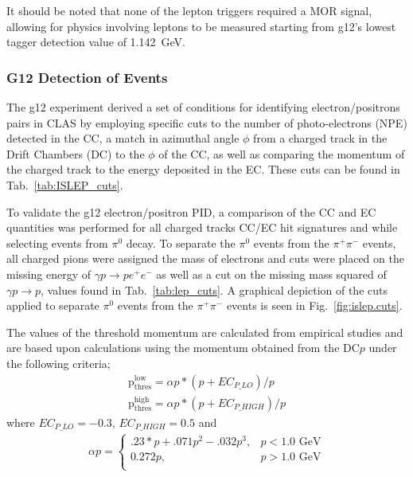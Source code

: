It should be noted that none of the lepton triggers required a MOR signal, allowing for physics involving leptons to be measured starting from g12's lowest tagger detection value of 1.142~GeV.





\FloatBarrier
	\subsubsection{G12 Detection of \epemT Events} 
     The g12 experiment derived a set of conditions for identifying electron/positrons pairs in CLAS by employing specific cuts to the number of photo-electrons (NPE) detected in the CC, a match in azimuthal angle $\phi$ from a charged track in the Drift Chambers (DC) to the $\phi$ of the CC, as well as comparing the momentum of the charged track to the energy deposited in the EC. These cuts can be found in Tab.~\ref{tab:ISLEP_cuts}.
	
	To validate the g12 electron/positron PID, a comparison of  the CC and EC quantities was performed for all charged tracks CC/EC hit signatures and while selecting events from $\pi^0$ decay. To separate the $\pi^0$ events from the $\pi^+\pi^-$ events, all charged pions were assigned the mass of electrons and cuts were placed on the missing energy of $\gamma p \rightarrow p e^+ e^-$ as well as a cut on the missing mass squared of $\gamma p \rightarrow p$, values found in Tab.~\ref{tab:lep_cuts}. A graphical depiction of the cuts applied to separate $\pi^0$ events from the $\pi^+\pi^-$ events is seen in Fig.~\ref{fig:islep.cuts}.
	
	The values of the threshold momentum are calculated from empirical studies and are based upon calculations using the momentum obtained from the DC$p$ under the following criteria;
	\begin{align}
	\mathrm{p_{thres}^{low}} = \alpha p *(p+EC_{P\_LO})/p \nonumber \\
	\mathrm{p_{thres}^{high}} = \alpha p *(p+EC_{P\_HIGH})/p \nonumber
	\end{align}
	where $EC_{P\_LO} = -0.3$, $EC_{P\_HIGH} = 0.5$ and
	\begin{align}
	\alpha p =
	\begin{cases}
	.23*p + .071p^2 - .032p^3, & p<1.0 \text{~GeV} \\
	0.272p, & p>1.0 \text{~GeV} \\
	\end{cases}\nonumber
	\end{align}
	
